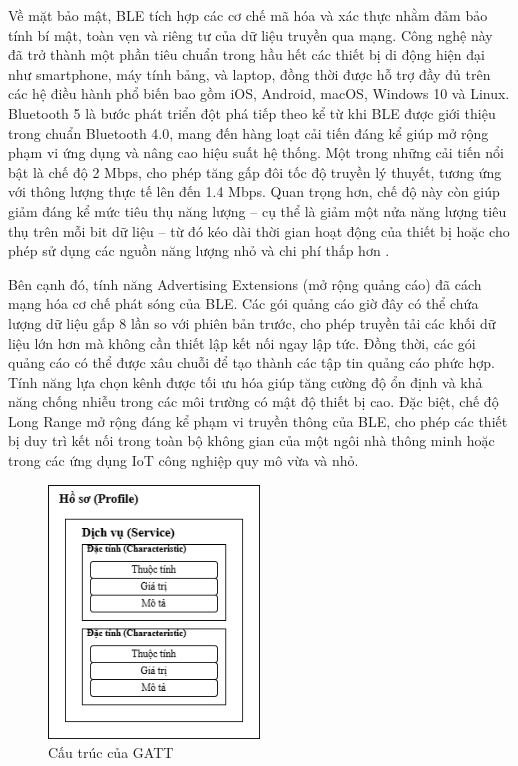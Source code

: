 Về mặt bảo mật, BLE tích hợp các cơ chế mã hóa và xác thực nhằm đảm bảo 
tính bí mật, toàn vẹn và riêng tư của dữ liệu truyền qua mạng. 
Công nghệ này đã trở thành một phần tiêu chuẩn trong hầu hết các 
thiết bị di động hiện đại như smartphone, máy tính bảng, và laptop, 
đồng thời được hỗ trợ đầy đủ trên các hệ điều hành phổ biến bao gồm iOS, 
Android, macOS, Windows 10 và Linux. Bluetooth 5 là bước phát triển 
đột phá tiếp theo kể từ khi BLE được giới thiệu trong chuẩn Bluetooth 
4.0, mang đến hàng loạt cải tiến đáng kể giúp mở rộng phạm vi ứng dụng 
và nâng cao hiệu suất hệ thống. Một trong những cải tiến nổi bật là 
chế độ 2 Mbps, cho phép tăng gấp đôi tốc độ truyền lý thuyết, tương 
ứng với thông lượng thực tế lên đến 1.4 Mbps. Quan trọng hơn, chế độ 
này còn giúp giảm đáng kể mức tiêu thụ năng lượng – cụ thể là giảm một 
nửa năng lượng tiêu thụ trên mỗi bit dữ liệu – từ đó kéo dài thời gian 
hoạt động của thiết bị hoặc cho phép sử dụng các nguồn năng lượng nhỏ 
và chi phí thấp hơn \cite{BLE}. 

Bên cạnh đó, tính năng Advertising Extensions (mở rộng quảng cáo) đã 
cách mạng hóa cơ chế phát sóng của BLE. Các gói quảng cáo giờ đây có 
thể chứa lượng dữ liệu gấp 8 lần so với phiên bản trước, cho phép 
truyền tải các khối dữ liệu lớn hơn mà không cần thiết lập kết nối 
ngay lập tức. Đồng thời, các gói quảng cáo có thể được xâu chuỗi 
để tạo thành các tập tin quảng cáo phức hợp. Tính năng lựa chọn kênh 
được tối ưu hóa giúp tăng cường độ ổn định và khả năng chống nhiễu 
trong các môi trường có mật độ thiết bị cao. Đặc biệt, chế độ Long 
Range mở rộng đáng kể phạm vi truyền thông của BLE, cho phép các thiết 
bị duy trì kết nối trong toàn bộ không gian của một ngôi nhà thông minh 
hoặc trong các ứng dụng IoT công nghiệp quy mô vừa và nhỏ.




\begin{figure}[!ht]
	\centering
 	\includegraphics[width=0.5\textwidth]{images/gatt.drawio.png}
	\caption{Cấu trúc của GATT}
	\label{gatt}
\end{figure}

